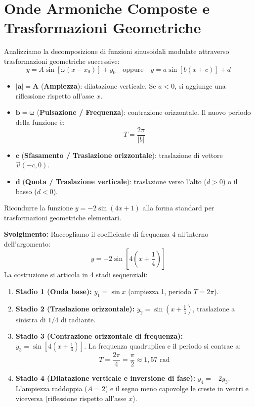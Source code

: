 \documentclass[11pt,a4paper,oneside]{report}
\begin{document}
\section{Onde Armoniche Composte e Trasformazioni Geometriche}
Analizziamo la decomposizione di funzioni sinusoidali modulate attraverso trasformazioni geometriche successive:
\begin{equation}
    y = A \sin[\omega(x - x_0)] + y_0 \quad \text{oppure} \quad y = a \sin[b(x + c)] + d
\end{equation}
\begin{itemize}
    \item $\mathbf{|a| = A}$ (\textbf{Ampiezza}): dilatazione verticale. Se $a < 0$, si aggiunge una riflessione rispetto all'asse $x$.
    \item $\mathbf{b = \omega}$ (\textbf{Pulsazione / Frequenza}): contrazione orizzontale. Il nuovo periodo della funzione è:
    \begin{equation}
        T = \frac{2\pi}{|b|}
    \end{equation}
    \item $\mathbf{c}$ (\textbf{Sfasamento / Traslazione orizzontale}): traslazione di vettore $\vec{v}(-c, 0)$.
    \item $\mathbf{d}$ (\textbf{Quota / Traslazione verticale}): traslazione verso l'alto ($d > 0$) o il basso ($d < 0$).
\end{itemize}

\begin{esercizio}[Decomposizione a 4 stadi dell'onda $y = -2\sin(4x + 1)$]
Ricondurre la funzione $y = -2\sin(4x + 1)$ alla forma standard per trasformazioni geometriche elementari.

\textbf{Svolgimento:}
Raccogliamo il coefficiente di frequenza $4$ all'interno dell'argomento:
\begin{equation}
    y = -2\sin\left[4\left(x + \frac{1}{4}\right)\right]
\end{equation}
La costruzione si articola in 4 stadi sequenziali:
\begin{enumerate}
    \item \textbf{Stadio 1 (Onda base):} $y_1 = \sin x$ (ampiezza 1, periodo $T = 2\pi$).
    \item \textbf{Stadio 2 (Traslazione orizzontale):} $y_2 = \sin\left(x + \frac{1}{4}\right)$, traslazione a sinistra di $1/4$ di radiante.
    \item \textbf{Stadio 3 (Contrazione orizzontale di frequenza):} $y_3 = \sin\left[4\left(x + \frac{1}{4}\right)\right]$. La frequenza quadruplica e il periodo si contrae a:
    \begin{equation*}
        T = \frac{2\pi}{4} = \frac{\pi}{2} \approx 1{,}57\text{ rad}
    \end{equation*}
    \item \textbf{Stadio 4 (Dilatazione verticale e inversione di fase):} $y_4 = -2 y_3$. L'ampiezza raddoppia ($A = 2$) e il segno meno capovolge le creste in ventri e viceversa (riflessione rispetto all'asse $x$).
\end{enumerate}
\end{esercizio}
\end{document}
